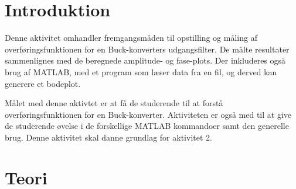 \section{Introduktion}\label{sec:intro}
Denne aktivitet omhandler fremgangsmåden til opstilling og måling af overføringsfunktionen for en Buck-konverters udgangsfilter. De målte resultater sammenlignes med de beregnede amplitude- og fase-plots. Der inkluderes også brug af MATLAB, med et program som læser data fra en fil, og derved kan generere et bodeplot. 

Målet med denne aktivtet er at få de studerende til at forstå overføringsfunktionen for en Buck-konverter. Aktiviteten er også med til at give de studerende øvelse i de forskellige MATLAB kommandoer samt den generelle brug. Denne aktivitet skal danne grundlag for aktivitet 2. 

\section{Teori}\label{sec:teori}